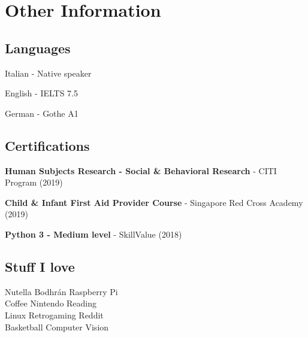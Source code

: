 \documentclass[a4paper]{deedy-resume} %
\begin{document}
\begin{minipage}[t]{0.28\textwidth} %

\section{Other Information}
\subsection{Languages}
\vspace{\topsep} %
\begin{tightitemize}
\item Italian - Native speaker
\item English - IELTS 7.5
\item German - Gothe A1
\end{tightitemize}
\sectionspace
\sectionspace
\subsection{Certifications}
\vspace{\topsep} %
\begin{tightitemize}
\item\textbf{Human Subjects Research - Social \& Behavioral Research} - CITI Program (2019) 
\item\textbf{Child \& Infant First Aid Provider Course} - Singapore Red Cross Academy (2019)
\item\textbf{Python 3 - Medium level} - SkillValue (2018)
\end{tightitemize}
\sectionspace
\sectionspace
\subsection{Stuff I love}
Nutella \textbullet{} Bodhrán \textbullet{} Raspberry Pi  \\Coffee \textbullet{} Nintendo \textbullet{} Reading \\	Linux \textbullet{} Retrogaming \textbullet{} Reddit \\ Basketball \textbullet{} Computer Vision  \\
\sectionspace %


\end{minipage}
\end{document}
